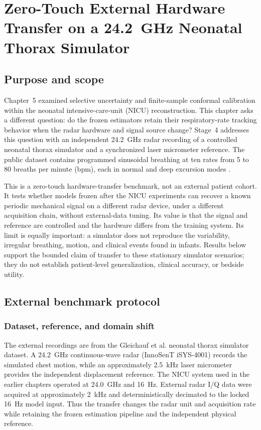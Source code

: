 \chapter{Zero-Touch External Hardware Transfer on a \texorpdfstring{\SI{24.2}{\giga\hertz}}{24.2 GHz} Neonatal Thorax Simulator}
\label{ch:external_transfer}

\section{Purpose and scope}

Chapter~5 examined selective uncertainty and finite-sample conformal calibration within the neonatal intensive-care-unit (NICU) reconstruction. This chapter asks a different question: do the frozen estimators retain their respiratory-rate tracking behavior when the radar hardware and signal source change? Stage~4 addresses this question with an independent 24.2~GHz radar recording of a controlled neonatal thorax simulator and a synchronized laser micrometer reference. The public dataset contains programmed sinusoidal breathing at ten rates from 5 to 80 breaths per minute (bpm), each in normal and deep excursion modes \citep{gleichauf2024time}.

This is a zero-touch hardware-transfer benchmark, not an external patient cohort. It tests whether models frozen after the NICU experiments can recover a known periodic mechanical signal on a different radar device, under a different acquisition chain, without external-data tuning. Its value is that the signal and reference are controlled and the hardware differs from the training system. Its limit is equally important: a simulator does not reproduce the variability, irregular breathing, motion, and clinical events found in infants. Results below support the bounded claim of transfer to these stationary simulator scenarios; they do not establish patient-level generalization, clinical accuracy, or bedside utility.

\section{External benchmark protocol}
\label{sec:ch6_protocol}

\subsection{Dataset, reference, and domain shift}

The external recordings are from the Gleichauf et al. neonatal thorax simulator dataset. A 24.2~GHz continuous-wave radar (InnoSenT iSYS-4001) records the simulated chest motion, while an approximately 2.5~kHz laser micrometer provides the independent displacement reference. The NICU system used in the earlier chapters operated at 24.0~GHz and 16~Hz. External radar I/Q data were acquired at approximately 2~kHz and deterministically decimated to the locked 16~Hz model input. Thus the transfer changes the radar unit and acquisition rate while retaining the frozen estimation pipeline and the independent physical reference.

